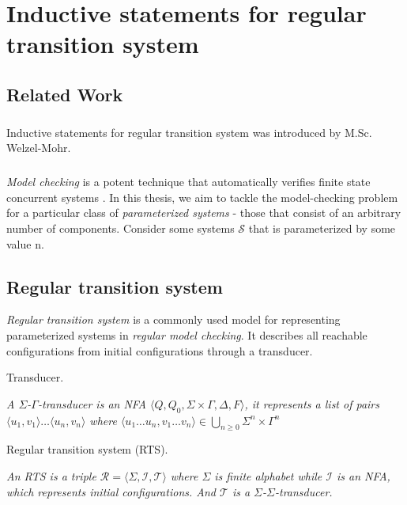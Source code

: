 \chapter{Inductive statements for regular transition system}\label{chapter:inductive_statement}
\section*{Related Work}
\paragraph*{}
Inductive statements for regular transition system was introduced by M.Sc. Welzel-Mohr.

\paragraph*{}
\textit{Model checking} is a potent technique that automatically verifies finite 
state concurrent systems \cite{clarke2009model}.
In this thesis, we aim to tackle the model-checking problem for a particular class 
of \textit{parameterized systems} - those that consist of an arbitrary number of components.
Consider some systems $\mathcal{S}$ that is parameterized by some value n.
\section*{Regular transition system}\label{section:rts}
\textit{Regular transition system} is a commonly used model for representing parameterized systems
in \textit{regular model checking}.
It describes all reachable configurations from initial configurations through a transducer.
\begin{definition}\label{definition:transducer}
    Transducer.
\end{definition}
\textit{
    A $\Sigma$-$\Gamma$-\textit{transducer} is an \textit{NFA} 
    $\langle Q, Q_0, \Sigma \times \Gamma, \Delta, F \rangle$,
    it represents a list of pairs $\langle u_1, v_1 \rangle \dots \langle u_n, v_n \rangle$
    where $\langle u_1 \dots u_n, v_1 \dots v_n \rangle \in \bigcup_{n \geq 0} \Sigma^{n} \times \Gamma^{n}$
}

\begin{definition}\label{definition:rts}
    Regular transition system (RTS).
\end{definition}
\textit{
   An RTS is a triple $\mathcal{R} = \langle \Sigma, \mathcal{I}, \mathcal{T} \rangle$ where $\Sigma$
   is finite alphabet while $\mathcal{I}$ is an NFA, which represents initial configurations.
   And $\mathcal{T}$ is a $\Sigma$-$\Sigma$-\textit{transducer}.
}


